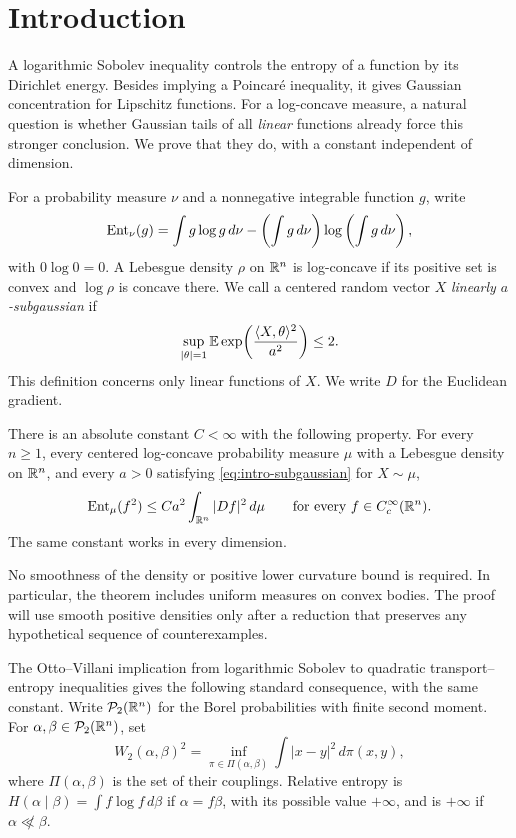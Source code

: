 \section{Introduction}\label{sec:introduction}

A logarithmic Sobolev inequality controls the entropy of a function by
its Dirichlet energy.  Besides implying a Poincar\'e inequality, it gives
Gaussian concentration for Lipschitz functions.  For a log-concave
measure, a natural question is whether Gaussian tails of all
\emph{linear} functions already force this stronger conclusion.
We prove that they do, with a constant independent of dimension.

For a probability measure \(\nu\) and a nonnegative integrable function \(g\),
write
\[
 \operatorname{Ent}_\nu(g)=\int g\log g\,d\nu
       -\left(\int g\,d\nu\right)\log\left(\int g\,d\nu\right),
\]
with \(0\log0=0\).  A Lebesgue density \(\rho\) on \(\mathbb R^n\) is log-concave
if its positive set is convex and \(\log\rho\) is concave there.
We call a centered random vector \(X\) \emph{linearly \(a\)-subgaussian} if
\begin{equation}\label{eq:intro-subgaussian}
 \sup_{|\theta|=1}\mathbb E\exp\!\left(\frac{\langle X,\theta\rangle^2}{a^2}\right)
 \le2.
\end{equation}
This definition concerns only linear functions of \(X\).  We write \(D\)
for the Euclidean gradient.

\begin{theorem}\label{thm:main}
There is an absolute constant \(C<\infty\) with the following property.
For every \(n\ge1\), every centered log-concave probability measure
\(\mu\) with a Lebesgue density on \(\mathbb R^n\), and every \(a>0\)
satisfying \eqref{eq:intro-subgaussian} for \(X\sim\mu\),
\[
 \operatorname{Ent}_\mu(f^2)\le C a^2\int_{\mathbb R^n}|Df|^2\,d\mu
 \qquad\text{for every }f\in C_c^\infty(\mathbb R^n).
\]
The same constant works in every dimension.
\end{theorem}

No smoothness of the density or positive lower curvature bound is required.
In particular, the theorem includes uniform measures on convex bodies.
The proof will use smooth positive densities only after a reduction that
preserves any hypothetical sequence of counterexamples.

The Otto--Villani implication from logarithmic Sobolev to quadratic
transport--entropy inequalities \cite[Theorem~1]{OttoVillani2000}
gives the following standard consequence, with the same constant.
Write $\mathcal P_2(\mathbb R^n)$ for the Borel probabilities with finite
second moment. For $\alpha,\beta\in\mathcal P_2(\mathbb R^n)$, set
\[
 W_2(\alpha,\beta)^2
 =\inf_{\pi\in\Pi(\alpha,\beta)}\int|x-y|^2\,d\pi(x,y),
\]
where $\Pi(\alpha,\beta)$ is the set of their couplings. Relative
entropy is $H(\alpha\mid\beta)=\int f\log f\,d\beta$ if
$\alpha=f\beta$, with its possible value $+\infty$, and is
$+\infty$ if $\alpha\not\ll\beta$.


